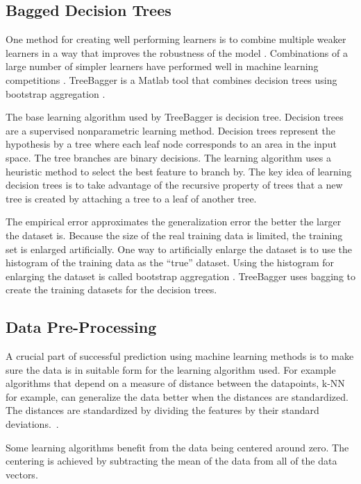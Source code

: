 \subsection{Bagged Decision Trees}
One method for creating well performing learners is to combine multiple weaker learners in a way that improves the robustness of the model \cite{alpaydin:2004:introduction}. Combinations of a large number of simpler learners have performed well in machine learning competitions \cite{kaggle:2015:winner}. TreeBagger is a Matlab tool that combines decision trees using bootstrap aggregation \cite{matlab:2015:treebagger}.

The base learning algorithm used by TreeBagger is decision tree. Decision trees are a supervised nonparametric learning method. Decision trees represent the hypothesis by a tree where each leaf node corresponds to an area in the input space. The tree branches are binary decisions. The learning algorithm uses a heuristic method to select the best feature to branch by. The key idea of learning decision trees is to take advantage of the recursive property of trees that a new tree is created by attaching a tree to a leaf of another tree. \cite{alpaydin:2004:introduction}

The empirical error approximates the generalization error the better the larger the dataset is. Because the size of the real training data is limited, the training set is enlarged artificially. One way to artificially enlarge the dataset is to use the histogram of the training data as the ``true'' dataset. Using the histogram for enlarging the dataset is called bootstrap aggregation \cite{breiman:1996:bagging}. TreeBagger uses bagging to create the training datasets for the decision trees.

\subsection{Data Pre-Processing}
\label{sec:data-pre-processing}
A crucial part of successful prediction using machine learning methods is to make sure the data is in suitable form for the learning algorithm used. For example algorithms that depend on a measure of distance between the datapoints, k-NN for example, can generalize the data better when the distances are standardized. The distances are standardized by dividing the features by their standard deviations.~\cite{alpaydin:2004:introduction}.

Some learning algorithms benefit from the data being centered around zero. The centering is achieved by subtracting the mean of the data from all of the data vectors.~\cite{alpaydin:2004:introduction}

